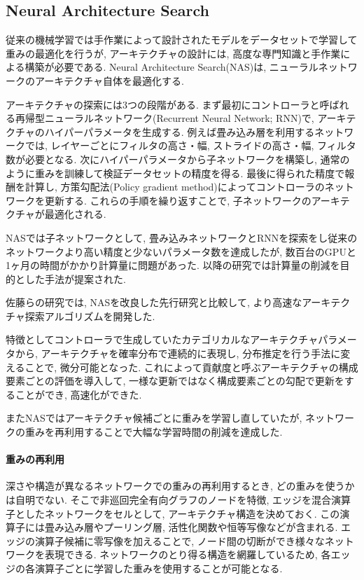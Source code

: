 \documentclass[twocolumn]{jarticle}     %
\begin{document}
\subsection{Neural Architecture Search}
従来の機械学習では手作業によって設計されたモデルをデータセットで学習して重みの最適化を行うが, アーキテクチャの設計には, 高度な専門知識と手作業による構築が必要である.
Neural Architecture Search(NAS)\cite{DBLP:journals/corr/ZophL16}は, ニューラルネットワークのアーキテクチャ自体を最適化する.


アーキテクチャの探索には3つの段階がある.
まず最初にコントローラと呼ばれる再帰型ニューラルネットワーク(Recurrent Neural Network; RNN)で, アーキテクチャのハイパーパラメータを生成する.
例えば畳み込み層を利用するネットワークでは, レイヤーごとにフィルタの高さ・幅, ストライドの高さ・幅, フィルタ数が必要となる.
次にハイパーパラメータから子ネットワークを構築し, 通常のように重みを訓練して検証データセットの精度を得る.
最後に得られた精度で報酬を計算し, 方策勾配法(Policy gradient method)によってコントローラのネットワークを更新する.
これらの手順を繰り返すことで, 子ネットワークのアーキテクチャが最適化される.

NASでは子ネットワークとして, 畳み込みネットワークとRNNを探索をし従来のネットワークより高い精度と少ないパラメータ数を達成したが, 数百台のGPUと1ヶ月の時間がかかり計算量に問題があった.
以降の研究では計算量の削減を目的とした手法が提案された.

佐藤ら\cite{ANAS}の研究では, NASを改良した先行研究と比較して, より高速なアーキテクチャ探索アルゴリズムを開発した.

特徴としてコントローラで生成していたカテゴリカルなアーキテクチャパラメータから,
アーキテクチャを確率分布で連続的に表現し, 分布推定を行う手法に変えることで, 微分可能となった.
これによって貢献度と呼ぶアーキテクチャの構成要素ごとの評価を導入して, 一様な更新ではなく構成要素ごとの勾配で更新をすることができ, 高速化ができた.

またNASではアーキテクチャ候補ごとに重みを学習し直していたが, ネットワークの重みを再利用することで大幅な学習時間の削減を達成した.

\paragraph{重みの再利用}
深さや構造が異なるネットワークでの重みの再利用するとき, どの重みを使うかは自明でない.
そこで非巡回完全有向グラフのノードを特徴, エッジを混合演算子としたネットワークをセルとして,
アーキテクチャ構造を決めておく.
この演算子には畳み込み層やプーリング層, 活性化関数や恒等写像などが含まれる.
エッジの演算子候補に零写像を加えることで, ノード間の切断ができ様々なネットワークを表現できる.
ネットワークのとり得る構造を網羅しているため, 各エッジの各演算子ごとに学習した重みを使用することが可能となる.
\end{document}
